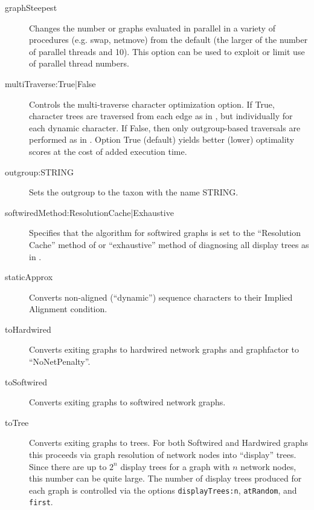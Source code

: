 \begin{description}
			\item[graphSteepest] Changes the number or graphs evaluated in parallel in a variety of procedures
			(e.g. swap, netmove) from the default (the larger of the number of parallel threads and 10).  This 
			option can be used to exploit or limit use of parallel thread numbers.  
			
			\item[multiTraverse:True|False] Controls the multi-traverse character optimization option.  If True, 
			character trees are traversed from each edge as in \citep{VaronandWheeler2012, VaronandWheeler2013, POY4, POY5},
			but individually for each dynamic character. If False, then only outgroup-based traversals are performed
			as in \citep{Wheeler1996, POY2, POY3}.  Option True (default) yields better (lower) optimality scores
			at the cost of added execution time.
			
			\item[outgroup:STRING]  Sets the outgroup to the taxon with the name STRING.
			
			\item[softwiredMethod:ResolutionCache|Exhaustive] Specifies that the algorithm for softwired graphs 
			is set to the ``Resolution Cache'' method of \cite{WheelerandWashburn2023} or ``exhaustive'' 
			method of diagnosing all display trees as in \cite{Wheeler2015}.
			
			\item[staticApprox] Converts non-aligned (``dynamic'') sequence characters to their Implied 
			Alignment \citep{Wheeler2003, WashburnandWheeler2020} condition.
			
			\item[toHardwired] Converts exiting graphs to hardwired network graphs and graphfactor to ``NoNetPenalty''.
			
			\item[toSoftwired] Converts exiting graphs to softwired network graphs.
			
			\item[toTree] Converts exiting graphs to trees. For both Softwired and Hardwired graphs 
			this proceeds via graph resolution of network nodes into ``display'' trees. Since there are up to 
			$2^n$ display trees for a graph with $n$ network nodes, this number can be quite large. 
			The number of display trees produced for each graph is controlled via the options 
			\texttt{displayTrees:n}, \texttt{atRandom}, and \texttt{first}. 
		\end{description}
			
